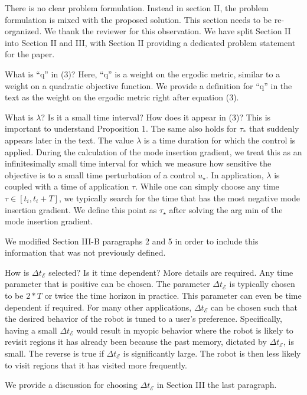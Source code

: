 \documentclass[10pt]{article}
\begin{document}
\begin{response}{
There is no clear problem formulation. 
Instead in section II, the problem formulation is mixed with the proposed solution. 
This section needs to be re-organized.
}
We thank the reviewer for this observation.
We have split Section II into Section II and III, with Section II providing a dedicated problem statement for the paper.
\end{response}

\begin{response}{What is ``q'' in (3)?}
Here, ``q'' is a weight on the ergodic metric, similar to a weight on a quadratic objective function.
We provide a definition for ``q'' in the text as the weight on the ergodic metric right after equation (3). 
\end{response}

\begin{response}{
What is $\lambda$? 
Is it a small time interval? 
How does it  appear in (3)? 
This is important to understand Proposition 1. 
The same also holds for $\tau_*$ that suddenly appears later in the text.
}
The value $\lambda$ is a time duration for which the control is applied. 
During the calculation of the mode insertion gradient, we treat this as an infinitesimally small time interval for which we measure how sensitive the objective is to a small time perturbation of a control $u_\star$.
In application, $\lambda$ is coupled with a time of application $\tau$.
While one can simply choose any time $\tau \in \left[ t_i, t_i +T \right]$, we typically search for the time that has the most negative mode insertion gradient. 
We define this point as $\tau_\star$ after solving the arg min of the mode insertion gradient.

We modified Section III-B paragraphs 2 and 5 in order to include this information that was not previously defined.
\end{response}


\begin{response}{
How is $\Delta t_{\mathcal{E}}$ selected? 
Is it time dependent? 
More details are required.
}
Any time parameter that is positive can be chosen.
The parameter $\Delta t_\mathcal{E}$ is typically chosen to be $2 * T$ or twice the time horizon in practice.
This parameter can even be time dependent if required.
For many other applications, $\Delta t_\mathcal{E}$ can be chosen such that the desired behavior of the robot is tuned to a user's preference.
Specifically, having a small $\Delta t_\mathcal{E}$ would result in myopic behavior where the robot is likely to revisit regions it has already been because the past memory, dictated by $\Delta t_\mathcal{E}$, is small.
The reverse is true if $\Delta t_\mathcal{E}$ is significantly large. 
The robot is then less likely to visit regions that it has visited more frequently. 

We provide a discussion for choosing $\Delta t_\mathcal{E}$ in Section III the last paragraph.
\end{response}
\end{document}
